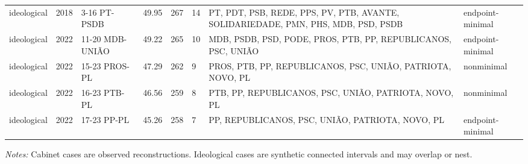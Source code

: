 \begin{landscape}
\begin{longtable}{lllrrlL{9.0cm}l}
ideological & 2018 & 3-16 PT-PSDB & 49.95 & 267 & 14 & PT, PDT, PSB, REDE, PPS, PV, PTB, AVANTE, SOLIDARIEDADE, PMN, PHS, MDB, PSD, PSDB & endpoint-minimal \\
ideological & 2022 & 11-20 MDB-UNIÃO & 49.22 & 265 & 10 & MDB, PSDB, PSD, PODE, PROS, PTB, PP, REPUBLICANOS, PSC, UNIÃO & endpoint-minimal \\
ideological & 2022 & 15-23 PROS-PL & 47.29 & 262 & 9 & PROS, PTB, PP, REPUBLICANOS, PSC, UNIÃO, PATRIOTA, NOVO, PL & nonminimal \\
ideological & 2022 & 16-23 PTB-PL & 46.56 & 259 & 8 & PTB, PP, REPUBLICANOS, PSC, UNIÃO, PATRIOTA, NOVO, PL & nonminimal \\
ideological & 2022 & 17-23 PP-PL & 45.26 & 258 & 7 & PP, REPUBLICANOS, PSC, UNIÃO, PATRIOTA, NOVO, PL & endpoint-minimal \\
\end{longtable}
\noindent\footnotesize\textit{Notes:} Cabinet cases are observed reconstructions. Ideological cases are synthetic connected intervals and may overlap or nest.
\endgroup
\end{landscape}
